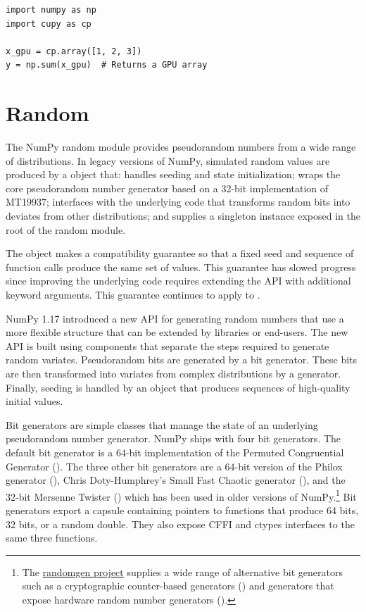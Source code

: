 \begin{lstlisting}
import numpy as np
import cupy as cp

x_gpu = cp.array([1, 2, 3])
y = np.sum(x_gpu)  # Returns a GPU array
\end{lstlisting}

\section*{Random}

The NumPy random module provides pseudorandom numbers from a wide range of
distributions. In legacy versions of NumPy, simulated random values are produced
by a  object that: handles seeding and state initialization;
wraps the core pseudorandom number generator based on a 32-bit implementation of
MT19937; interfaces with the underlying code that transforms random bits into
deviates from other distributions; and supplies a singleton instance exposed in
the root of the random module.

The  object makes a compatibility guarantee so that a fixed
seed and sequence of function calls produce the same set of values. This
guarantee has slowed progress since improving the underlying code requires
extending the API with additional keyword arguments. This guarantee continues to
apply to . 

NumPy 1.17 introduced a new API for generating random numbers that use a more
flexible structure that can be extended by libraries or end-users. The new API
is built using components that separate the steps required to generate random
variates. Pseudorandom bits are generated by a bit generator. These bits are
then transformed into variates from complex distributions by a generator.
Finally, seeding is handled by an object that produces sequences of high-quality
initial values.

Bit generators are simple classes that manage the state of an underlying
pseudorandom number generator. NumPy ships with four bit generators. The default
bit generator is a 64-bit implementation of the Permuted Congruential Generator
\cite{pcg64} (). The three other bit generators are a 64-bit version
of the Philox generator\cite{random123} (), Chris Doty-Humphrey's
Small Fast Chaotic generator\cite{practrand} (), and the 32-bit
Mersenne Twister\cite{mt19937} () which has been used in older
versions of NumPy.\footnote{The
\href{https://github.com/bashtage/randomgen}{randomgen project} supplies a wide
range of alternative bit generators such as a cryptographic counter-based
generators () and generators that expose hardware random number
generators ()\cite{randomgen}.} Bit generators export a capsule
containing pointers to functions that produce 64 bits, 32 bits, or a random
double. They also expose CFFI and ctypes interfaces to the same three functions.

